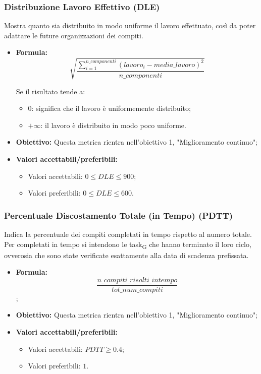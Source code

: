 \subsubsection{Distribuzione Lavoro Effettivo (DLE)}
Mostra quanto sia distribuito in modo uniforme il lavoro effettuato, così da poter adattare le future organizzazioni dei compiti.
\begin{itemize}
	\item \textbf{Formula:}\[\sqrt{\frac{\sum_{i=1}^{n\_componenti}(lavoro_i-media\_lavoro)^2}{n\_componenti}}\]

	Se il risultato tende a:
	\begin{itemize}
		\item 0: significa che il lavoro è uniformemente distribuito;
		\item $+\infty$: il lavoro è distribuito in modo poco uniforme.
	\end{itemize}
	\item \textbf{Obiettivo:} Questa metrica rientra nell'obiettivo 1, "Miglioramento continuo";
	\item \textbf{Valori accettabili/preferibili: }
	\begin{itemize}
		\item Valori accettabili: $0 \leq DLE \leq 900$;
		\item Valori preferibili: $0 \leq DLE \leq 600$.
	\end{itemize}
\end{itemize}

\subsubsection{Percentuale Discostamento Totale (in Tempo) (PDTT)}
Indica la percentuale dei compiti completati in tempo rispetto al numero totale. Per completati in tempo si intendono le task\textsubscript{G} che hanno terminato il loro ciclo, ovverosia che sono state verificate esattamente alla data di scadenza prefissata.
\begin{itemize}
	\item \textbf{Formula:}\[\frac{n\_compiti\_risolti\_intempo}{tot\_num\_compiti}\];
	\item \textbf{Obiettivo:} Questa metrica rientra nell'obiettivo 1, "Miglioramento continuo";
	\item \textbf{Valori accettabili/preferibili: }
	\begin{itemize}
		\item Valori accettabili: $PDTT \geq 0.4$;
		\item Valori preferibili: $1$.
	\end{itemize}
\end{itemize}

